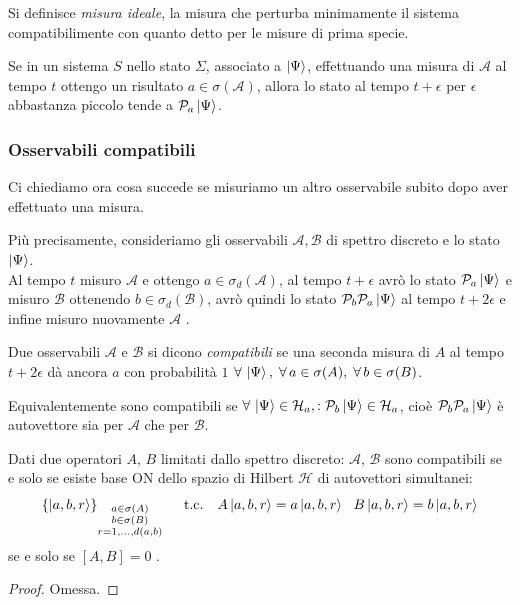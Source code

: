 \begin{definition}
    Si definisce \textit{misura ideale}, la misura che perturba minimamente il sistema compatibilimente con quanto detto per le misure di prima specie.
\end{definition}


\begin{postulato5}
    Se in un sistema \(S\) nello stato \(\Sigma\), associato a \(\ket{\Psi}\), effettuando una misura di \(\mathcal{A}\) al tempo \(t\) ottengo un risultato \(a \in \sigma(\mathcal{A})\),
    allora lo stato al tempo \(t+\epsilon\) per \(\epsilon\) abbastanza piccolo tende a \(\mathcal{P}_a\ket{\Psi}\).
\end{postulato5}


\subsubsection{Osservabili compatibili}  
Ci chiediamo ora cosa succede se misuriamo un altro osservabile subito dopo aver effettuato una misura.

Più precisamente, consideriamo gli osservabili \(\mathcal{A}, \mathcal{B}\) di spettro discreto e lo stato \(\ket{\Psi}\).\\
Al tempo \(t\) misuro \(\mathcal{A}\) e ottengo \(a \in \sigma_d(\mathcal{A})\), al tempo \(t+\epsilon\) avrò lo stato \(\mathcal{P}_a\ket{\Psi}\) e misuro \(\mathcal{B}\) ottenendo \(b \in \sigma_d(\mathcal{B})\),
avrò quindi lo stato \(\mathcal{P}_b\mathcal{P}_a\ket{\Psi}\) al tempo \(t+2\epsilon\) e infine misuro nuovamente \(\mathcal{A}\) .

\begin{definition}
    Due osservabili \(\mathcal{A}\) e \(\mathcal{B}\) si dicono \textit{compatibili} se una seconda misura di \(A\) al tempo \(t+2\epsilon\)
    dà ancora \(a\) con probabilità \(1\)  \( \forall\, \ket{\Psi},\; \forall\, a \in \sigma(A),\; \forall\, b \in \sigma(B) \).
\end{definition}

\begin{remark}
    Equivalentemente sono compatibili se \( \forall\, \ket{\Psi} \in \mathcal{H}_a,: \mathcal{P}_b \ket{\Psi} \in \mathcal{H}_a \), cioè
    \(\mathcal{P}_b \mathcal{P}_a \ket{\Psi}\) è autovettore sia per \(\mathcal{A}\) che per \(\mathcal{B}\).
\end{remark}

\begin{theorem}
    Dati due operatori \(A, \,B\) limitati dallo spettro discreto: \(\mathcal{A}, \,\mathcal{B}\) sono compatibili se e solo se esiste base ON dello spazio di Hilbert \(\mathcal{H}\) di autovettori simultanei: 
    \[
    \left\{ \ket{a,b,r} \right\}_{\substack{a \in \sigma(A)\\b \in \sigma(B)\\ r = 1,\dots,d(a,b)}} \quad \text{ t.c.} \quad A\ket{a,b,r}= a\ket{a,b,r}\ \ B\ket{a,b,r}=b\ket{a,b,r}
    \]
    se e solo se \(\left[ A, B \right]=0\) .
\end{theorem}
\begin{proof}
    Omessa.
\end{proof}

